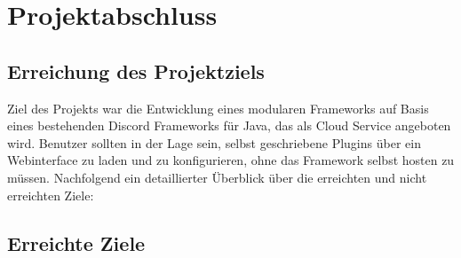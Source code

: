 
\section{Projektabschluss}\label{projektabschluss}

\subsection{Erreichung des Projektziels}\label{erreichung-des-projektziels}

Ziel des Projekts war die Entwicklung eines modularen Frameworks auf Basis eines bestehenden Discord Frameworks für Java, das als Cloud Service angeboten wird. Benutzer sollten in der Lage sein, selbst geschriebene Plugins über ein Webinterface zu laden und zu konfigurieren, ohne das Framework selbst hosten zu müssen. Nachfolgend ein detaillierter Überblick über die erreichten und nicht erreichten Ziele:

\subsection*{Erreichte Ziele}

